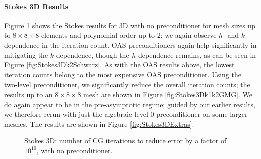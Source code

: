 \paragraph{Stokes 3D Results}
Figure \ref{fig:Stokes3DNoPreconditioner} shows the Stokes results for 3D with no preconditioner for mesh sizes up to $8 \times 8 \times 8$ elements and polynomial order up to 2; we again observe $h$- and $k$-dependence in the iteration count.  OAS preconditioners again help significantly in mitigating the $k$-dependence, though the $h$-dependence remains, as can be seen in Figure \ref{fig:Stokes3Dk2Schwarz}.  As with the OAS results above, the lowest iteration counts belong to the most expensive OAS preconditioner.  Using the two-level preconditioner, we significantly reduce the overall iteration counts; the results up to an $8 \times 8 \times 8$ mesh are shown in Figure \ref{fig:Stokes3Dk1k2GMG}.  We do again appear to be in the pre-asymptotic regime; guided by our earlier results, we therefore rerun with just the algebraic level-0 preconditioner on some larger meshes.  The results are shown in Figure \ref{fig:Stokes3DExtras}.


\begin{figure}[ht]
	\centering
		    \scalebox{\plotscaling}{
			\begin{tikzpicture}
			\begin{axis}[
			    scaled ticks=false,
			    tick label style={/pgf/number format/fixed},
			    title={Stokes 3D, No Preconditioner}, 
			    xlabel={Mesh Width (\# Elements)}, 
			    ylabel={Iteration Count}, 
			    grid=major,
			    legend entries={$k=1$,$k=2$},
			    legend pos=outer north east,
			    xtick=data,
			    xticklabels={2,4,8},
			    ytick={700,2000,4300,6100,14000}
			  ]
			  \addplot table [header=false, x index=\meshwidthindex, y index=\iterationcountindex, each nth point=\StokesThreeDNthPoint, skip first n=1, filter discard warning=false, unbounded coords=discard, skip coords between index={\StokesThreeDStride}{\maxmyrows}]{data/StokesDriver3D_results_512_ranks_nonconforming.dat};
			  \addplot table [header=false, x index=\meshwidthindex, y index=\iterationcountindex, each nth point=\StokesThreeDNthPoint, skip first n=2, filter discard warning=false, unbounded coords=discard, skip coords between index={\StokesThreeDStride}{\maxmyrows}]{data/StokesDriver3D_results_512_ranks_nonconforming.dat};
			\end{axis}
			\end{tikzpicture}
		    }
	\caption{Stokes 3D: number of CG iterations to reduce error by a factor of $10^{10}$, with no preconditioner.}
	\label{fig:Stokes3DNoPreconditioner}
\end{figure}

